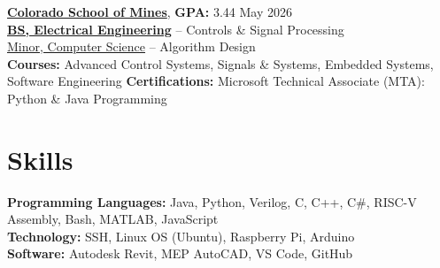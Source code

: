 \documentclass[11pt]{article}       %
\begin{document}
\textbf{\href{https://www.mines.edu/}{Colorado School of Mines}}, \textbf{GPA:} 3.44  \hfill May 2026\\
\textbf{\href{https://electrical.mines.edu/undergraduate-program/}{BS, Electrical Engineering}} -- Controls \& Signal Processing  \\
\href{https://cs.mines.edu/csmines-minors-and-areas-of-special-interest/}{Minor, Computer Science} -- Algorithm Design\\
\textbf{Courses:} Advanced Control Systems, Signals \& Systems, Embedded Systems, Software Engineering
\textbf{Certifications:} Microsoft Technical Associate (MTA): Python \& Java Programming

\section*{Skills}
\vspace{5pt}

\textbf{Programming Languages:} Java, Python, Verilog, C, C++, C\#, RISC-V Assembly, Bash, MATLAB, JavaScript \\
\textbf{Technology:} SSH, Linux OS (Ubuntu), Raspberry Pi, Arduino \\
\textbf{Software:} Autodesk Revit, MEP AutoCAD, VS Code, GitHub \\
\end{document}
